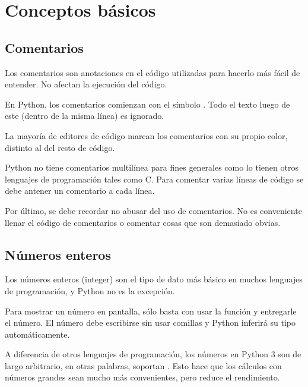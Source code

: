 \chapter{Conceptos básicos}

\section{Comentarios}

Los comentarios son anotaciones en el código utilizadas para hacerlo más fácil de entender. No afectan la ejecución del código.\smallskip

En Python, los comentarios comienzan con el símbolo \ttt{\#}. Todo el texto luego de este \ttt{\#} (dentro de la misma línea) es ignorado.


La mayoría de editores de código marcan los comentarios con su propio color, distinto al del resto de código.


Python no tiene comentarios multilínea para fines generales como lo tienen otros lenguajes de programación tales como C. Para comentar varias líneas de código se debe antener un comentario a cada línea.


Por último, se debe recordar no abusar del uso de comentarios. No es conveniente llenar el código de comentarios o comentar cosas que son demasiado obvias.


\section{Números enteros}

Los números enteros (integer) son el tipo de dato más básico en muchos lenguajes de programación, y Python no es la excepción.\smallskip

Para mostrar un número en pantalla, sólo basta con usar la función  y entregarle el número. El número debe escribirse sin usar comillas y Python inferirá su tipo automáticamente.


A diferencia de otros lenguajes de programación, los números en Python 3 son de largo arbitrario, en otras palabras, soportan . Esto hace que los cálculos con números grandes sean mucho más convenientes, pero reduce el rendimiento.

